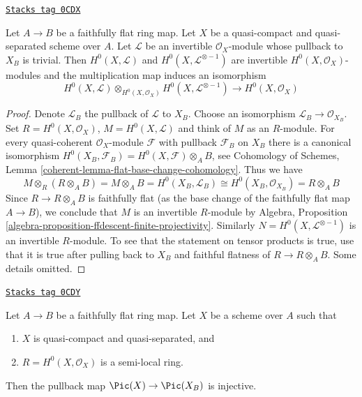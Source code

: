\begin{lemma}
\label{varieties-lemma-change-rings-pic-pre}
\href{https://stacks.math.columbia.edu/tag/0CDX}{\texttt{Stacks tag 0CDX}}

Let $A \to B$ be a faithfully flat ring map. Let $X$ be a quasi-compact and
quasi-separated scheme over $A$. Let $\mathcal{L}$ be an invertible
$\mathcal{O}_X$-module whose pullback to $X_B$ is trivial. Then
$H^0(X, \mathcal{L})$ and $H^0(X, \mathcal{L}^{\otimes -1})$ are invertible
$H^0(X, \mathcal{O}_X)$-modules and the
multiplication map induces an isomorphism
$$
H^0(X, \mathcal{L}) \otimes_{H^0(X, \mathcal{O}_X)}
H^0(X, \mathcal{L}^{\otimes -1}) \longrightarrow
H^0(X, \mathcal{O}_X)
$$
\end{lemma}

\begin{proof}
Denote $\mathcal{L}_B$ the pullback of $\mathcal{L}$ to $X_B$.
Choose an isomorphism $\mathcal{L}_B \to \mathcal{O}_{X_B}$.
Set $R = H^0(X, \mathcal{O}_X)$, $M = H^0(X, \mathcal{L})$ and think of
$M$ as an $R$-module. For every quasi-coherent $\mathcal{O}_X$-module
$\mathcal{F}$ with pullback $\mathcal{F}_B$ on $X_B$ there is a
canonical isomorphism
$H^0(X_B, \mathcal{F}_B) = H^0(X, \mathcal{F}) \otimes_A B$, see
Cohomology of Schemes, Lemma \ref{coherent-lemma-flat-base-change-cohomology}.
Thus we have
$$
M \otimes_R (R \otimes_A B) =
M \otimes_A B = H^0(X_B, \mathcal{L}_B) \cong
H^0(X_B, \mathcal{O}_{X_B}) = R \otimes_A B
$$
Since $R \to R \otimes_A B$ is faithfully flat (as the base change
of the faithfully flat map $A \to B$), we conclude
that $M$ is an invertible $R$-module by
Algebra, Proposition \ref{algebra-proposition-ffdescent-finite-projectivity}.
Similarly $N = H^0(X, \mathcal{L}^{\otimes -1})$ is an invertible $R$-module.
To see that the statement on tensor products is true, use that it is true
after pulling back to $X_B$ and faithful flatness of $R \to R \otimes_A B$.
Some details omitted.
\end{proof}

\begin{lemma}
\label{varieties-lemma-change-rings-pic}
\href{https://stacks.math.columbia.edu/tag/0CDY}{\texttt{Stacks tag 0CDY}}

Let $A \to B$ be a faithfully flat ring map.
Let $X$ be a scheme over $A$ such that
\begin{enumerate}
\item $X$ is quasi-compact and quasi-separated, and
\item $R = H^0(X, \mathcal{O}_X)$ is a semi-local ring.
\end{enumerate}
Then the pullback map $\Pic(X) \to \Pic(X_B)$ is injective.
\end{lemma}

